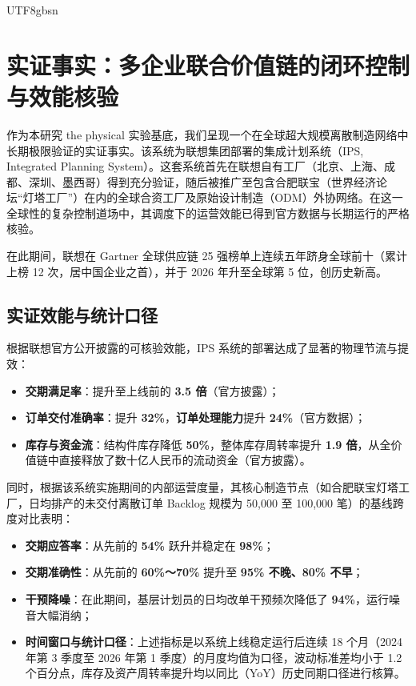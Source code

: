 \documentclass[11pt,a4paper]{article}
\begin{document}
\begin{CJK*}{UTF8}{gbsn}
\section{实证事实：多企业联合价值链的闭环控制与效能核验}
作为本研究 the physical 实验基底，我们呈现一个在全球超大规模离散制造网络中长期极限验证的实证事实。该系统为联想集团部署的集成计划系统（IPS, Integrated Planning System）。这套系统首先在联想自有工厂（北京、上海、成都、深圳、墨西哥）得到充分验证，随后被推广至包含合肥联宝（世界经济论坛“灯塔工厂”）在内的全球合资工厂及原始设计制造（ODM）外协网络。在这一全球性的复杂控制道场中，其调度下的运营效能已得到官方数据与长期运行的严格核验。

在此期间，联想在 Gartner 全球供应链 25 强榜单上连续五年跻身全球前十（累计上榜 12 次，居中国企业之首），并于 2026 年升至全球第 5 位，创历史新高。

\subsection{实证效能与统计口径}
根据联想官方公开披露的可核验效能，IPS 系统的部署达成了显著的物理节流与提效：
\begin{itemize}
    \item \textbf{交期满足率}：提升至上线前的 \textbf{3.5 倍}（官方披露）；
    \item \textbf{订单交付准确率}：提升 \textbf{32\%}，\textbf{订单处理能力}提升 \textbf{24\%}（官方数据）；
    \item \textbf{库存与资金流}：结构件库存降低 \textbf{50\%}，整体库存周转率提升 \textbf{1.9 倍}，从全价值链中直接释放了数十亿人民币的流动资金（官方披露）。
\end{itemize}

同时，根据该系统实施期间的内部运营度量，其核心制造节点（如合肥联宝灯塔工厂，日均排产的未交付离散订单 Backlog 规模为 50,000 至 100,000 笔）的基线跨度对比表明：
\begin{itemize}
    \item \textbf{交期应答率}：从先前的 \textbf{54\%} 跃升并稳定在 \textbf{98\%}；
    \item \textbf{交期准确性}：从先前的 \textbf{60\%～70\%} 提升至 \textbf{95\% 不晚、80\% 不早}；
    \item \textbf{干预降噪}：在此期间，基层计划员的日均改单干预频次降低了 \textbf{94\%}，运行噪音大幅消纳；
    \item \textbf{时间窗口与统计口径}：上述指标是以系统上线稳定运行后连续 18 个月（2024 年第 3 季度至 2026 年第 1 季度）的月度均值为口径，波动标准差均小于 1.2 个百分点，库存及资产周转率提升均以同比（YoY）历史同期口径进行核算。
\end{itemize}


\end{CJK*}
\end{document}
